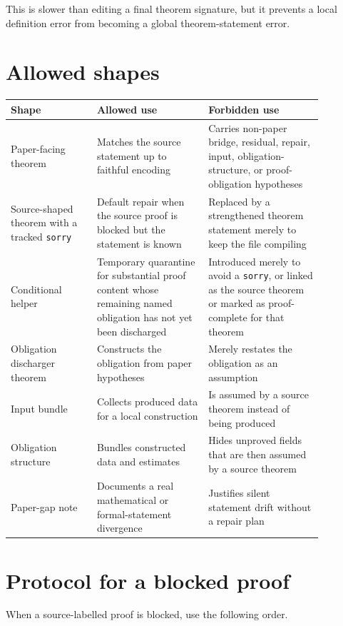 \documentclass[11pt]{article}
\begin{document}
This is slower than editing a final theorem signature, but it prevents a local
definition error from becoming a global theorem-statement error.

\section{Allowed shapes}

\begin{center}
\begin{tabular}{p{0.24\linewidth}p{0.31\linewidth}p{0.32\linewidth}}
\textbf{Shape} & \textbf{Allowed use} & \textbf{Forbidden use} \\
\hline
Paper-facing theorem & Matches the source statement up to faithful encoding &
Carries non-paper bridge, residual, repair, input, obligation-structure, or
proof-obligation hypotheses \\
Source-shaped theorem with a tracked \verb|sorry| & Default repair when the
source proof is blocked but the statement is known & Replaced by a strengthened
theorem statement merely to keep the file compiling \\
Conditional helper & Temporary quarantine for substantial proof content whose
remaining named obligation has not yet been discharged & Introduced merely to
avoid a \verb|sorry|, or linked as the source theorem or marked as
proof-complete for that theorem \\
Obligation discharger theorem & Constructs the obligation from paper hypotheses &
Merely restates the obligation as an assumption \\
Input bundle & Collects produced data for a local construction & Is assumed by a
source theorem instead of being produced \\
Obligation structure & Bundles constructed data and estimates & Hides unproved
fields that are then assumed by a source theorem \\
Paper-gap note & Documents a real mathematical or formal-statement divergence &
Justifies silent statement drift without a repair plan
\end{tabular}
\end{center}

\section{Protocol for a blocked proof}

When a source-labelled proof is blocked, use the following order.
\end{document}
